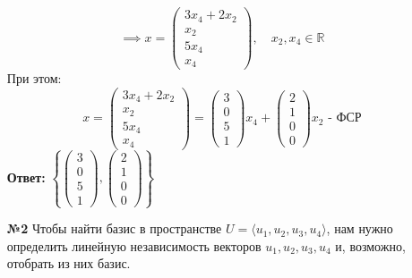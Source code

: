 \documentclass[a4paper]{article}
\newcommand{\mat}[1]{\begin{pmatrix} #1 \end{pmatrix}}
\newcommand{\RR}{\mathbb{R}}
\begin{document}
\begin{enumerate}
    $$\implies x = \mat{3x_4+2x_2 \\ x_2 \\ 5x_4 \\ x_4}, \quad x_2, x_4 \in \RR$$
    При этом:
    $$x = \mat{3x_4+2x_2 \\ x_2 \\ 5x_4 \\ x_4} = \mat{3 \\ 0 \\ 5 \\ 1}x_4+\mat{2\\1\\0\\0}x_2 \text{ - ФСР}$$
    \textbf{Ответ: } $\left\{\mat{3 \\ 0 \\ 5 \\ 1}, \mat{2\\1\\0\\0} \right\}$\\

    \item[\textbf{№2}]Чтобы найти базис в пространстве $ U = \langle u_{1}, u_{2}, u_{3}, u_{4} \rangle $, нам нужно определить линейную независимость векторов $ u_{1}, u_{2}, u_{3}, u_{4} $ и, возможно, отобрать из них базис.
    

\end{enumerate}
\end{document}
